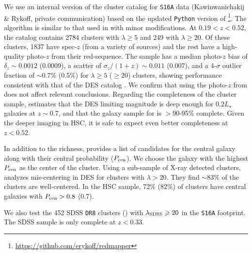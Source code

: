\documentclass[fleqn,usenatbib,useAMS,english]{mnras}
\begin{document}
    We use an internal version of the \redm{} cluster catalog for \texttt{S16A} data
    (Kawinwanichakij \& Rykoff, private communication) based on the updated \texttt{Python}
    version of \redm{}\footnote{\url{https://github.com/erykoff/redmapper}}.
    The algorithm is similar to that used in \citet{Rykoff2016} with minor modifications.
    At $0.19 < z < 0.52$, the catalog contains 2784 clusters with $\lambda \geq 5$ and 249 with
    $\lambda \geq 20$.
    Of these clusters, 1837 have spec-$z$ (from a variety of sources) and the rest have a
    high-quality photo-$z$ from their red-sequence.
    The sample has a median photo-$z$ bias of $\delta_{z} \sim 0.0012$ (0.0009), a scatter of
    $\sigma_{z}/(1 + z) \sim 0.011$ (0.007), and a 4-$\sigma$ outlier fraction of $\sim 0.7$\%
    (0.5\%) for $\lambda \geq 5$ ($\geq 20$) clusters, showing performance consistent
    with that of the DES catalog \citet{McClintock2019}.
    We confirm that using the photo-$z$ from \redm{} does not affect relevant conclusions.
    Regarding the completeness of the cluster sample, \citet{McClintock2019} estimates that
    the DES limiting magnitude is deep enough for $0.2 L_{\star}$ galaxies at $z \sim 0.7$,
    and that the galaxy sample for \redm{} is $>90$-95\% complete.
    Given the deeper imaging in HSC, it is safe to expect even better completeness at
    $z<0.52$.

    In addition to the richness, \redm{} provides a list of candidates for the central galaxy
    along with their central probability ($P_{\rm cen}$).
    We choose the galaxy with the highest $P_{\rm cen}$ as the center of the cluster.
    Using a sub-sample of X-ray detected clusters, \citet{Zhang2019b} analyzes
    \redm{} mis-centering in DES for clusters with $\lambda > 20$. They find
    $\sim 83$\% of the clusters are well-centered.
    In the HSC \redm{} sample, 72\% (82\%) of clusters have central galaxies with $P_{\rm cen} >
    0.8$ (0.7).

    We also test the 452 SDSS \texttt{DR8} \redm{} clusters (\citealt{Rykoff2014}) with
    $\lambda_{\rm SDSS} \geq 20$ in the \texttt{S16A} footprint.
    The SDSS sample is only complete at $z < 0.33$.

\end{document}
